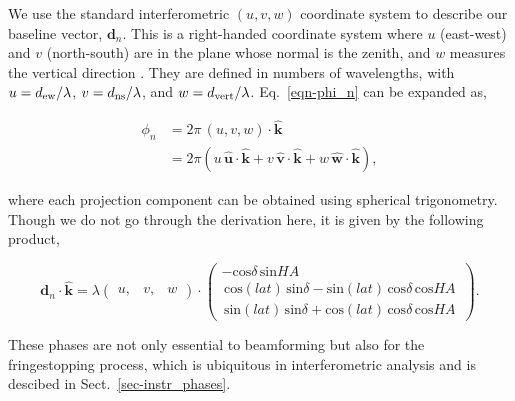 We use the standard interferometric $(u, v, w)$ coordinate system 
to describe our baseline vector, $\mathbf{d}_n$. This is a 
right-handed coordinate system where $u$ (east-west) and $v$ (north-south) are in the plane 
whose normal is the zenith, and $w$ measures the vertical direction \citep{1986isra.book.....T}.
They are defined in numbers of wavelengths, with
$u = d_{\rm ew} / \lambda$, $v = d_{\rm ns} / \lambda$, 
and $w = d_{\rm vert} / \lambda$. Eq.~\ref{eqn-phi_n} can be expanded 
as,

\begin{align}   
\phi_n &= 2\pi \, (u, v, w) \cdot \mathbf{\hat{k}}\\
&= 2 \pi \left ( 
u \, \mathit{\mathbf{\hat{u}}} \cdot \mathbf{\hat{k}} + 
v \, \mathbf{\hat{v}} \cdot \mathbf{\hat{k}} + 
w \, \mathbf{\hat{w}} \cdot \mathbf{\hat{k}} 
\right ),
\end{align}

\noindent where each projection component can be obtained 
using spherical trigonometry. Though we do not go through the
derivation here, it is given by the following product,

\begin{equation}
\label{eq-fringestop_phase}
\mathbf{d}_n \cdot  {\mathbf{\hat{k}}} = \lambda \begin{pmatrix}
u, & v, & w
\end{pmatrix}  \cdot \begin{pmatrix} 
-\mathrm{cos}\delta \,\mathrm{sin}HA \\ 
\, \mathrm{cos}(lat) \, \mathrm{sin}\delta - \mathrm{sin}(lat) \, \mathrm{cos}\delta \, \mathrm{cos}HA \,\\
\, \mathrm{sin}(lat) \, \mathrm{sin}\delta + \mathrm{cos}(lat) \, \mathrm{cos}\delta \, \mathrm{cos} HA\,
\end{pmatrix} .
\end{equation}

These phases are not only essential to beamforming but 
also for the fringestopping process, which is ubiquitous in 
interferometric analysis and is descibed in Sect.~\ref{sec-instr_phases}.


